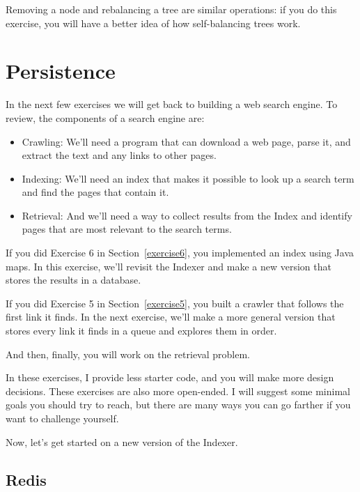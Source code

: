 \documentclass[12pt]{book}
\theoremstyle{exercise}
\begin{document}
{{{Removing a node and rebalancing a tree are similar operations: if you do
this exercise, you will have a better idea of how self-balancing trees
work.


\chapter{Persistence}

In the next few exercises we will get back to building a web search
engine. To review, the components of a search engine are:

\begin{itemize}

\item
  Crawling: We'll need a program that can download a web page, parse it,
  and extract the text and any links to other pages.

\item
  Indexing: We'll need an index that makes it possible to look up a
  search term and find the pages that contain it.

\item
  Retrieval: And we'll need a way to collect results from the Index and
  identify pages that are most relevant to the search terms.

\end{itemize}

If you did Exercise 6 in Section~\ref{exercise6}, you implemented an index
using Java maps. In this exercise, we'll revisit the Indexer and make
a new version that stores the results in a database.

If you did Exercise 5 in Section~\ref{exercise5}, you
built a crawler that follows the first link it finds. In the next exercise,
we'll make a more general version that stores every link it finds in a
queue and explores them in order.

And then, finally, you will work on the retrieval problem.

In these exercises, I provide less starter code, and you will make more
design decisions. These exercises are also more open-ended. I will suggest
some minimal goals you should try to reach, but there are many ways you
can go farther if you want to challenge yourself.

Now, let's get started on a new version of the Indexer.

\section{Redis}
\label{redis}

}}}
\end{document}
